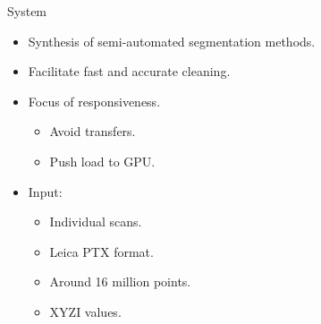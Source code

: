 \documentclass{beamer}
\begin{document}
\begin{frame}{System}

\begin{itemize}
\item Synthesis of semi-automated segmentation methods.
\item Facilitate fast and accurate cleaning.
\item Focus of responsiveness.
\begin{itemize}
\item Avoid transfers.
\item Push load to GPU.
\end{itemize}
\item Input:
\begin{itemize}
\item Individual scans.
\item Leica PTX format.
\item Around 16 million points. %
\item XYZI values.
\end{itemize}

\end{itemize}

\end{frame}
\end{document}
